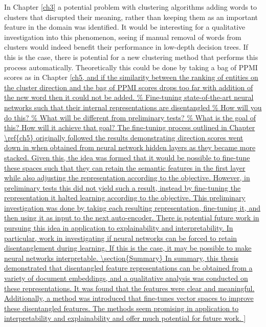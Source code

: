 In Chapter \ref{ch3} a potential problem with clustering algorithms adding words to clusters that disrupted their meaning, rather than keeping them as an important feature in the domain was identified. It would be interesting for a qualitative investigation into this phenomenon, seeing if manual removal of words from clusters would indeed benefit their performance in low-depth decision trees. If this is the case, there is potential for a new clustering method that performs this process automatically. Theoretically this could be done by taking a bag of PPMI scores as in Chapter \ref{ch5, and if the similarity between the ranking of entities on the cluster direction and the bag of PPMI scores drops too far with addition of the new word then it could not be added. 




The fine-tuning process outlined in Chapter \ref{ch5} originally followed the results demonstrating  direction scores went down in when obtained from neural network hidden layers as they became more stacked. Given this, the idea was formed that it would be possible to fine-tune these spaces such that they can retain the semantic features in the first layer while also adjusting the representation according to the objective. However, in preliminary tests this did not yield such a result, instead by fine-tuning the representation it halted learning according to the objective. This preliminary investigation was done by taking each resulting representation, fine-tuning it, and then using it as input to the next auto-encoder. There is potential future work in pursuing this idea in application to explainability and interpretability. In particular, work in investigating if neural networks can be forced to retain disentanglement during learning. If this is the case, it may be possible to make neural networks interpretable.




\section{Summary}

In summary, this thesis demonstrated that disentangled feature representations can be obtained from a variety of document embeddings, and a qualitative analysis was conducted on these representations. It was found that the features were clear and meaningful. Additionally, a method was introduced that fine-tunes vector spaces to improve these disentangled features. The methods seem promising in application to interpretability and explainability and offer much potential for future work.

}
